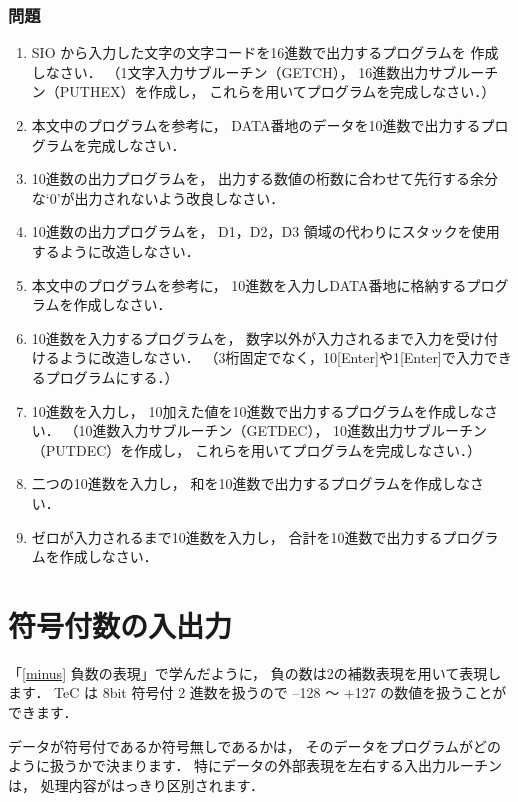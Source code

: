 \subsubsection{問題}
\begin{enumerate}
\item SIO から入力した文字の文字コードを16進数で出力するプログラムを
作成しなさい．
（1文字入力サブルーチン（GETCH），
16進数出力サブルーチン（PUTHEX）を作成し，
これらを用いてプログラムを完成しなさい．）
\item 本文中のプログラムを参考に，
DATA番地のデータを10進数で出力するプログラムを完成しなさい．
\item 10進数の出力プログラムを，
出力する数値の桁数に合わせて先行する余分な`0'が出力されないよう改良しなさい．
\item 10進数の出力プログラムを，
D1，D2，D3 領域の代わりにスタックを使用するように改造しなさい．
\item 本文中のプログラムを参考に，
10進数を入力しDATA番地に格納するプログラムを作成しなさい．
\item 10進数を入力するプログラムを，
数字以外が入力されるまで入力を受け付けるように改造しなさい．
（3桁固定でなく，10[Enter]や1[Enter]で入力できるプログラムにする．）
\item 10進数を入力し，
10加えた値を10進数で出力するプログラムを作成しなさい．
（10進数入力サブルーチン（GETDEC），
10進数出力サブルーチン（PUTDEC）を作成し，
これらを用いてプログラムを完成しなさい．）
\item 二つの10進数を入力し，
和を10進数で出力するプログラムを作成しなさい．
\item ゼロが入力されるまで10進数を入力し，
合計を10進数で出力するプログラムを作成しなさい．
\end{enumerate}

\newpage
\section{符号付数の入出力}

「\ref{minus} 負数の表現」で学んだように，
負の数は2の補数表現を用いて表現します．
TeC は 8bit 符号付 2 進数を扱うので
--128 〜 +127 の数値を扱うことができます．

データが符号付であるか符号無しであるかは，
そのデータをプログラムがどのように扱うかで決まります．
特にデータの外部表現を左右する入出力ルーチンは，
処理内容がはっきり区別されます．

